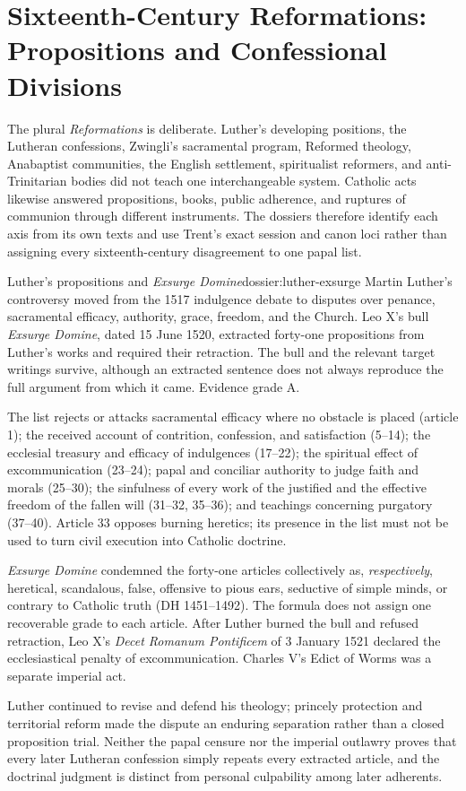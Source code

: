 \section{Sixteenth-Century Reformations: Propositions and Confessional Divisions}

The plural \emph{Reformations} is deliberate. Luther's developing positions, the Lutheran confessions, Zwingli's sacramental program, Reformed theology, Anabaptist communities, the English settlement, spiritualist reformers, and anti-Trinitarian bodies did not teach one interchangeable system. Catholic acts likewise answered propositions, books, public adherence, and ruptures of communion through different instruments. The dossiers therefore identify each axis from its own texts and use Trent's exact session and canon loci rather than assigning every sixteenth-century disagreement to one papal list.

\begin{heresydossier}{Luther's propositions and \emph{Exsurge Domine}}{dossier:luther-exsurge}
\objectfield Martin Luther's controversy moved from the 1517 indulgence debate to disputes over penance, sacramental efficacy, authority, grace, freedom, and the Church. Leo X's bull \emph{Exsurge Domine}, dated 15 June 1520, extracted forty-one propositions from Luther's works and required their retraction. The bull and the relevant target writings survive, although an extracted sentence does not always reproduce the full argument from which it came. Evidence grade A.

\propositionfield The list rejects or attacks sacramental efficacy where no obstacle is placed (article 1); the received account of contrition, confession, and satisfaction (5--14); the ecclesial treasury and efficacy of indulgences (17--22); the spiritual effect of excommunication (23--24); papal and conciliar authority to judge faith and morals (25--30); the sinfulness of every work of the justified and the effective freedom of the fallen will (31--32, 35--36); and teachings concerning purgatory (37--40). Article 33 opposes burning heretics; its presence in the list must not be used to turn civil execution into Catholic doctrine.

\responsefield \emph{Exsurge Domine} condemned the forty-one articles collectively as, \emph{respectively}, heretical, scandalous, false, offensive to pious ears, seductive of simple minds, or contrary to Catholic truth (DH 1451--1492). The formula does not assign one recoverable grade to each article. After Luther burned the bull and refused retraction, Leo X's \emph{Decet Romanum Pontificem} of 3 January 1521 declared the ecclesiastical penalty of excommunication. Charles V's Edict of Worms was a separate imperial act.

\aftermathfield Luther continued to revise and defend his theology; princely protection and territorial reform made the dispute an enduring separation rather than a closed proposition trial. Neither the papal censure nor the imperial outlawry proves that every later Lutheran confession simply repeats every extracted article, and the doctrinal judgment is distinct from personal culpability among later adherents.
\end{heresydossier}

